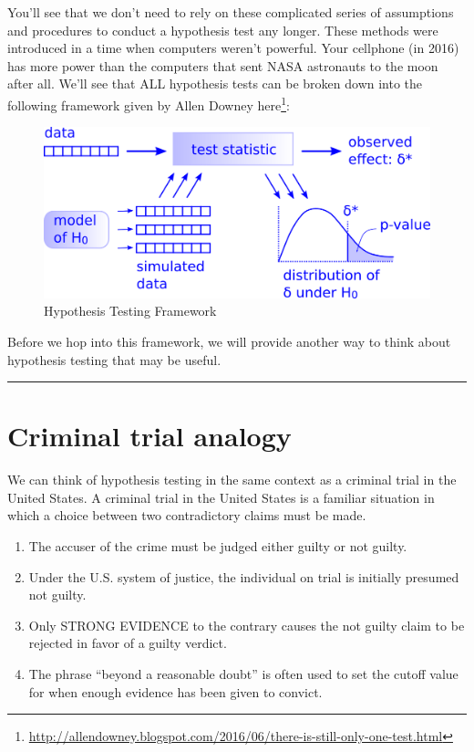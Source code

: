 \documentclass[12pt,]{krantz}
\renewcommand{\href}[2]{#2\footnote{\url{#1}}}
\begin{document}
You'll see that we don't need to rely on these complicated series of
assumptions and procedures to conduct a hypothesis test any longer.
These methods were introduced in a time when computers weren't powerful.
Your cellphone (in 2016) has more power than the computers that sent
NASA astronauts to the moon after all. We'll see that ALL hypothesis
tests can be broken down into the following framework given by Allen
Downey
\href{http://allendowney.blogspot.com/2016/06/there-is-still-only-one-test.html}{here}:

\begin{figure}

{\centering \includegraphics[width=\textwidth]{images/ht} 

}

\caption{Hypothesis Testing Framework}\label{fig:htdowney}
\end{figure}

Before we hop into this framework, we will provide another way to think
about hypothesis testing that may be useful.

\begin{center}\rule{0.5\linewidth}{\linethickness}\end{center}

\section{Criminal trial analogy}\label{trial}

We can think of hypothesis testing in the same context as a criminal
trial in the United States. A criminal trial in the United States is a
familiar situation in which a choice between two contradictory claims
must be made.

\begin{enumerate}
\def\labelenumi{\arabic{enumi}.}
\item
  The accuser of the crime must be judged either guilty or not guilty.
\item
  Under the U.S. system of justice, the individual on trial is initially
  presumed not guilty.
\item
  Only STRONG EVIDENCE to the contrary causes the not guilty claim to be
  rejected in favor of a guilty verdict.
\item
  The phrase ``beyond a reasonable doubt'' is often used to set the
  cutoff value for when enough evidence has been given to convict.
\end{enumerate}
\end{document}
